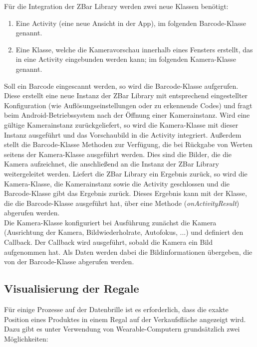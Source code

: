 Für die Integration der ZBar Library werden zwei neue Klassen benötigt:
\begin{enumerate}
	\item Eine Activity (eine neue Ansicht in der App), im folgenden Barcode-Klasse genannt.
	\item Eine Klasse, welche die Kameravorschau innerhalb eines Fensters erstellt, das in eine Activity eingebunden werden kann; im folgenden Kamera-Klasse genannt.
\end{enumerate} 
Soll ein Barcode eingescannt werden, so wird die Barcode-Klasse aufgerufen. Diese erstellt eine neue Instanz der ZBar Library mit entsprechend eingestellter Konfiguration (wie \zB Auflösungseinstellungen oder zu erkennende Codes) und fragt beim Android-Betriebssystem nach der Öffnung einer Kamerainstanz. Wird eine gültige Kamerainstanz zurückgeliefert, so wird die Kamera-Klasse mit dieser Instanz ausgeführt und das Vorschaubild in die Activity integriert. Außerdem stellt die Barcode-Klasse Methoden zur Verfügung, die bei Rückgabe von Werten seitens der Kamera-Klasse ausgeführt werden. Dies sind die Bilder, die die Kamera aufzeichnet, die anschließend an die Instanz der ZBar Library weitergeleitet werden. Liefert die ZBar Library ein Ergebnis zurück, so wird die Kamera-Klasse, die Kamerainstanz sowie die Activity geschlossen und die Barcode-Klasse gibt das Ergebnis zurück. Dieses Ergebnis kann mit der Klasse, die die Barcode-Klasse ausgeführt hat, über eine Methode (\emph{onActivityResult}) abgerufen werden.\\

Die Kamera-Klasse konfiguriert bei Ausführung zunächst die Kamera (Ausrichtung der Kamera, Bildwiederholrate, Autofokus, ...) und definiert den Callback. Der Callback wird ausgeführt, sobald die Kamera ein Bild aufgenommen hat. Als Daten werden dabei die Bildinformationen übergeben, die von der Barcode-Klasse abgerufen werden.

\subsection{Visualisierung der Regale}
Für einige Prozesse auf der Datenbrille ist es erforderlich, dass die exakte Position eines Produktes in einem Regal auf der Verkaufsfläche angezeigt wird. Dazu gibt es unter Verwendung von Wearable-Computern grundsätzlich zwei Möglichkeiten:

